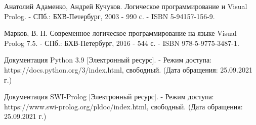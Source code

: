 \newpage

\begin{thebibliography}{3}
	Анатолий Адаменко, Андрей Кучуков. Логическое программирование и Visual Prolog. - СПб.: БХВ-Петербург, 2003 - 990 с. - ISBN 5-94157-156-9.
	
	Марков, В. Н. Современное логическое программирование на языке Visual Prolog 7.5. - СПб.: БХВ-Петербург, 2016 - 544 с. - ISBN 978-5-9775-3487-1.
	
	Документация Python 3.9 [Электронный ресурс]. - Режим доступа: https://docs.python.org/3/index.html, свободный. (Дата обращения: 25.09.2021 г.)
	
	Документация SWI-Prolog [Электронный ресурс]. - Режим доступа: https://www.swi-prolog.org/pldoc/index.html, свободный. (Дата обращения: 25.09.2021 г.)
	
\end{thebibliography}